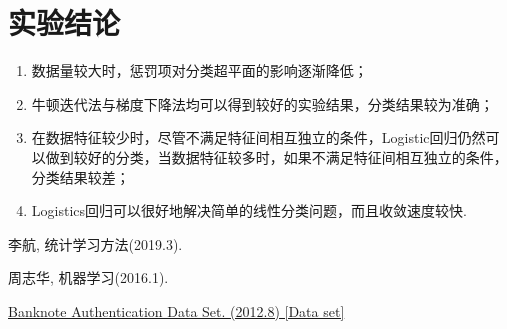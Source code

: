 \documentclass{hitreport}
\begin{document}
\section{实验结论}

\begin{enumerate}
\item 数据量较大时，惩罚项对分类超平面的影响逐渐降低；
\item 牛顿迭代法与梯度下降法均可以得到较好的实验结果，分类结果较为准确；
\item 在数据特征较少时，尽管不满足特征间相互独立的条件，Logistic回归仍然可以做到较好的分类，当数据特征较多时，如果不满足特征间相互独立的条件，分类结果较差；
\item Logistics回归可以很好地解决简单的线性分类问题，而且收敛速度较快.
\end{enumerate}

\renewcommand\refname{参考文献}
 
\begin{thebibliography}{2}
李航, 统计学习方法(2019.3).

周志华, 机器学习(2016.1).

\href{http://archive.ics.uci.edu/ml/datasets/banknote+authentication}{Banknote Authentication Data Set. (2012.8) [Data set]}
\end{thebibliography}
\end{document}
